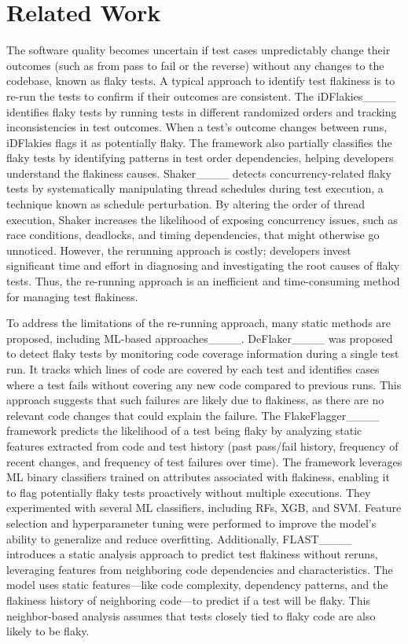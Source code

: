 \section{Related Work}
\label{sec:related-works}

The software quality becomes uncertain if test cases unpredictably change their outcomes (such as from pass to fail or the reverse) without any changes to the codebase, known as flaky tests. A typical approach to identify test flakiness is to re-run the tests to confirm if their outcomes are consistent. The iDFlakies____ identifies flaky tests by running tests in different randomized orders and tracking inconsistencies in test outcomes. When a test’s outcome changes between runs, iDFlakies flags it as potentially flaky. The framework also partially classifies the flaky tests by identifying patterns in test order dependencies, helping developers understand the flakiness causes. Shaker____ detects concurrency-related flaky tests by systematically manipulating thread schedules during test execution, a technique known as schedule perturbation. By altering the order of thread execution, Shaker increases the likelihood of exposing concurrency issues, such as race conditions, deadlocks, and timing dependencies, that might otherwise go unnoticed. However, the rerunning approach is costly; developers invest significant time and effort in diagnosing and investigating the root causes of flaky tests. Thus, the re-running approach is an inefficient and time-consuming method for managing test flakiness. 

To address the limitations of the re-running approach, many static methods are proposed, including ML-based approaches____. DeFlaker____ was proposed to detect flaky tests by monitoring code coverage information during a single test run. It tracks which lines of code are covered by each test and identifies cases where a test fails without covering any new code compared to previous runs. This approach suggests that such failures are likely due to flakiness, as there are no relevant code changes that could explain the failure. The FlakeFlagger____ framework predicts the likelihood of a test being flaky by analyzing static features extracted from code and test history (past pass/fail history, frequency of recent changes, and frequency of test failures over time). The framework leverages ML binary classifiers trained on attributes associated with flakiness, enabling it to flag potentially flaky tests proactively without multiple executions. They experimented with several ML classifiers, including RFs, XGB, and SVM. Feature selection and hyperparameter tuning were performed to improve the model’s ability to generalize and reduce overfitting. Additionally, FLAST____ introduces a static analysis approach to predict test flakiness without reruns, leveraging features from neighboring code dependencies and characteristics. The model uses static features—like code complexity, dependency patterns, and the flakiness history of neighboring code—to predict if a test will be flaky. This neighbor-based analysis assumes that tests closely tied to flaky code are also likely to be flaky.

